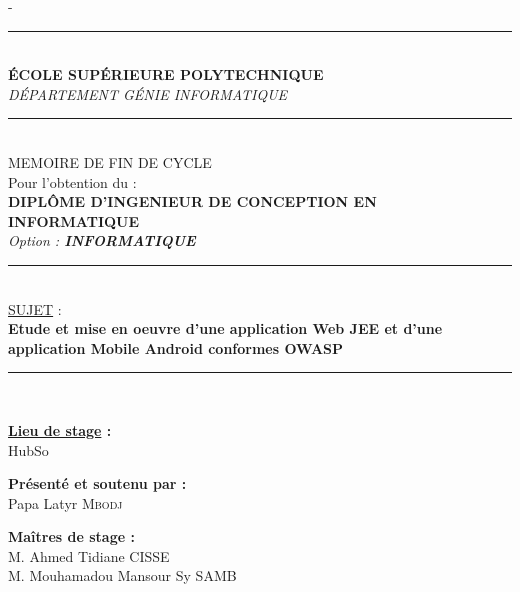 \begin{titlingpage}
\begin{SingleSpace}
\begin{adjustwidth*}{\unitlength}{-\unitlength}
\begin{center}
				\vspace{5mm}
				\hrule~\\[0.2cm]
				\vspace{5mm}
				{\large \textbf{ÉCOLE SUPÉRIEURE POLYTECHNIQUE} }\\
				{\large \textit{DÉPARTEMENT GÉNIE INFORMATIQUE} }\\
				\vspace{5mm}
				\hrule~\\[0.2cm]
				\vspace{5mm}
				{\large MEMOIRE DE FIN DE CYCLE }~\\[0.1cm]
				{\large Pour l'obtention du : }~\\[0.1cm]
				{\large \textbf{DIPLÔME D'INGENIEUR DE CONCEPTION EN INFORMATIQUE} }~\\[0.1cm]
				{\large \textit{Option : \textbf{INFORMATIQUE}} }~\\[0.1cm]
				\vspace{5mm}
				\hrule~\\[0.1cm]
				\vspace{5mm}
				{\large \underline{SUJET} : }~\\[0.1cm]
				\vspace{3mm}
				\textbf{\huge Etude et mise en oeuvre d'une application Web JEE et d'une application Mobile Android conformes OWASP }\\[4mm]
				\vspace{5mm}
				\hrule~\\[0.1cm]
				\vspace{5mm}
				\begin{center}
					{\textbf{\underline{Lieu de stage} :}}\\
					HubSo\\
				\end{center}
				\vspace{12mm}
				\begin{minipage}[t]{0.33333\textwidth}
					\centering
					{\textbf{Présenté et soutenu par :}}\\
					Papa Latyr \textsc{Mbodj}\\
				\end{minipage}%
				\begin{minipage}[t]{0.33333\textwidth}
					\centering
					{\textbf{Maîtres de stage : }}\\
					{{M. Ahmed Tidiane CISSE}}\\
					{{M. Mouhamadou Mansour Sy SAMB}}\\
				\end{minipage}%

\end{center}
\end{adjustwidth*}
\end{SingleSpace}
\end{titlingpage}
